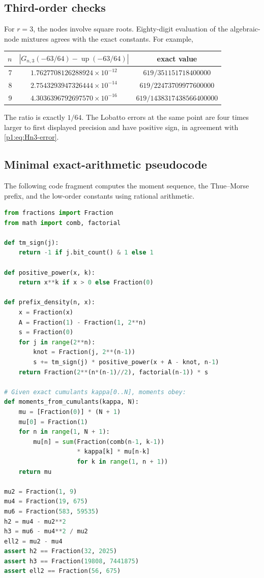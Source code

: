 \documentclass[11pt]{article}
\numberwithin{equation}{section}
\theoremstyle{definition}
\theoremstyle{remark}
\newcommand{\Up}{\operatorname{up}}
\newcommand{\abs}[1]{\left|#1\right|}
\begin{document}
\subsection{Third-order checks}

For $r=3$, the nodes involve square roots.  Eighty-digit evaluation of the algebraic-node mixtures agrees with the exact constants.  For example,
\begin{center}
\begin{tabular}{@{}rcc@{}}
\toprule
$n$ & $\abs{G_{n,3}(-63/64)-\Up(-63/64)}$ & exact value\\
\midrule
7 & $1.7627708126288924\times10^{-12}$ & $619/351151718400000$\\
8 & $2.7543293947326444\times10^{-14}$ & $619/22473709977600000$\\
9 & $4.3036396792697570\times10^{-16}$ & $619/1438317438566400000$\\
\bottomrule
\end{tabular}
\end{center}
The ratio is exactly $1/64$.  The Lobatto errors at the same point are four times larger to first displayed precision and have positive sign, in agreement with \eqref{p1:eq:Hn3-error}.

\subsection{Minimal exact-arithmetic pseudocode}

The following code fragment computes the moment sequence, the Thue--Morse prefix, and the low-order constants using rational arithmetic.

\begin{lstlisting}[style=code,language=Python,caption={Exact arithmetic for moments and dyadic prefix values.}]
from fractions import Fraction
from math import comb, factorial

def tm_sign(j):
    return -1 if j.bit_count() & 1 else 1

def positive_power(x, k):
    return x**k if x > 0 else Fraction(0)

def prefix_density(n, x):
    x = Fraction(x)
    A = Fraction(1) - Fraction(1, 2**n)
    s = Fraction(0)
    for j in range(2**n):
        knot = Fraction(j, 2**(n-1))
        s += tm_sign(j) * positive_power(x + A - knot, n-1)
    return Fraction(2**(n*(n-1)//2), factorial(n-1)) * s

# Given exact cumulants kappa[0..N], moments obey:
def moments_from_cumulants(kappa, N):
    mu = [Fraction(0)] * (N + 1)
    mu[0] = Fraction(1)
    for n in range(1, N + 1):
        mu[n] = sum(Fraction(comb(n-1, k-1))
                    * kappa[k] * mu[n-k]
                    for k in range(1, n + 1))
    return mu

mu2 = Fraction(1, 9)
mu4 = Fraction(19, 675)
mu6 = Fraction(583, 59535)
h2 = mu4 - mu2**2
h3 = mu6 - mu4**2 / mu2
ell2 = mu2 - mu4
assert h2 == Fraction(32, 2025)
assert h3 == Fraction(19808, 7441875)
assert ell2 == Fraction(56, 675)
\end{lstlisting}
\end{document}
